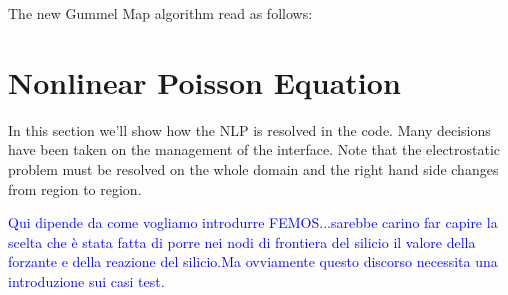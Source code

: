 The new Gummel Map algorithm read as follows:




\section{Nonlinear Poisson Equation}
In this section we'll show how the NLP is resolved in the code. Many decisions have been taken on the management of the interface. Note that the electrostatic problem must be resolved on the whole domain and the right hand side changes from region to region.

\textcolor{blue}{Qui dipende da come vogliamo introdurre FEMOS...sarebbe carino far capire la scelta che è stata fatta di porre nei nodi di frontiera del silicio il valore della forzante e della reazione del silicio.Ma ovviamente questo discorso necessita una introduzione sui casi test.}

